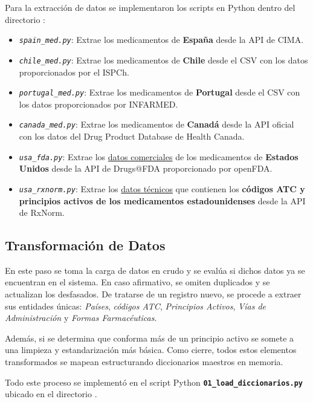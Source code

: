 \documentclass[12pt, a4paper]{report}
\begin{document}
Para la extracción de datos se implementaron los scripts en Python dentro del directorio \textit{}:

\begin{itemize}
    \item \textit{\texttt{spain\_med.py}}: Extrae los medicamentos de \textbf{España} desde la API de CIMA.
    \item \textit{\texttt{chile\_med.py}}: Extrae los medicamentos de \textbf{Chile} desde el CSV con los datos proporcionados por el ISPCh.
    \item \textit{\texttt{portugal\_med.py}}: Extrae los medicamentos de \textbf{Portugal} desde el CSV con los datos proporcionados por INFARMED.
    \item \textit{\texttt{canada\_med.py}}: Extrae los medicamentos de \textbf{Canadá} desde la API oficial con los datos del Drug Product Database de Health Canada.
    \item \textit{\texttt{usa\_fda.py}}: Extrae los \uline{datos comerciales} de los medicamentos de \textbf{Estados Unidos} desde la API de Drugs@FDA proporcionado por openFDA.
    \item \textit{\texttt{usa\_rxnorm.py}}: Extrae los \uline{datos técnicos} que contienen los \textbf{códigos ATC y principios activos de los medicamentos estadounidenses} desde la API de RxNorm.
\end{itemize}

\subsection{Transformación de Datos}
En este paso se toma la carga de datos en crudo y se evalúa si dichos datos ya se encuentran en el sistema. En caso afirmativo, se omiten duplicados y se actualizan los desfasados. De tratarse de un registro nuevo, se procede a extraer sus entidades únicas: \textit{Países}, \textit{códigos ATC}, \textit{Principios Activos}, \textit{Vías de Administración} y \textit{Formas Farmacéuticas}.

Además, si se determina que conforma más de un principio activo se somete a una limpieza y estandarización más básica. Como cierre, todos estos elementos transformados se mapean estructurando diccionarios maestros en memoria.

Todo este proceso se implementó en el script Python \textbf{\texttt{01\_load\_diccionarios.py}} ubicado en el directorio \textit{}.
\end{document}
